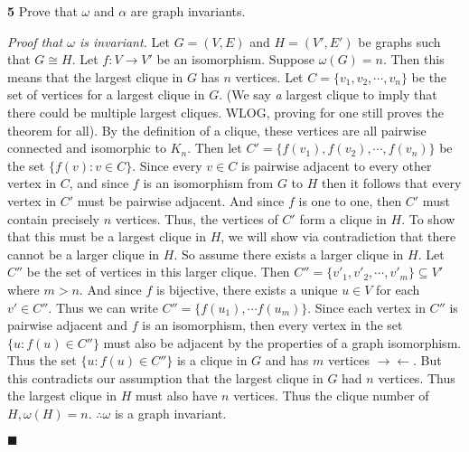 \documentclass{article}
\begin{document}
\setlength{\parindent}{0cm}   %


\textbf{5} Prove that \(\omega\) and \(\alpha\) are graph invariants. 


\vspace{2mm}

\textit{Proof that \(\omega\) is invariant.} Let \(G= (V,E)\) and \(H=(V',E')\) be graphs such that \(G \cong H\). Let \(f:V\rightarrow V'\) be an isomorphism. Suppose \(\omega(G) = n\). Then this means that the largest clique in \(G\) has \(n\) vertices. Let \(C=\{v_1, v_2,\cdots, v_n\}\) be the set of vertices for a largest clique in \(G\). (We say \textit{a} largest clique to imply that there could be multiple largest cliques. WLOG, proving for one still proves the theorem for all). By the definition of a clique, these vertices are all pairwise connected and isomorphic to \(K_n\). Then let \(C'=\{f(v_1), f(v_2), \cdots, f(v_n)\}  \) be the set \(\{f(v) : v\in C\}\). Since every \(v\in C\) is pairwise adjacent to every other vertex in \(C\), and since \(f\) is an isomorphism from \(G\) to \(H\) then it follows that every vertex in \(C'\) must be pairwise adjacent. And since \(f\) is one to one, then \(C'\) must contain precisely \(n\) vertices. Thus, the vertices of \(C'\) form a clique in \(H\). To show that this must be a largest clique in \(H\), we will show via contradiction that there cannot be a larger clique in \(H\). So assume there exists a larger clique in \(H\). Let \(C''\) be the set of vertices in this larger clique. Then \( C'' =\{v'_1,v'_2, \cdots,v'_m\} \subseteq V' \) where \( m>n\). And since \(f\) is bijective, there exists a unique \(u \in V\) for each \(v' \in C''\). Thus we can write \(C''=\{f(u_1), \cdots f(u_m)\} \). Since each vertex in \(C'' \) is pairwise adjacent and  \(f\) is an isomorphism, then every vertex in the set \( \{ u : f(u) \in C''\}\) must also be adjacent by the properties of a graph isomorphism. Thus the set \( \{ u : f(u) \in C''\}\) is a clique in \(G\) and has \(m\) vertices \( \rightarrow\!\leftarrow \). But this contradicts our assumption that the largest clique in \(G\) had \(n\) vertices. Thus the largest clique in \(H\) must also have \(n \) vertices. Thus the clique number of \(H, \omega(H)=n\). \(\therefore \omega\) is a graph invariant. 

\begin{flushright}
\(\blacksquare\)
\end{flushright}
\end{document}
